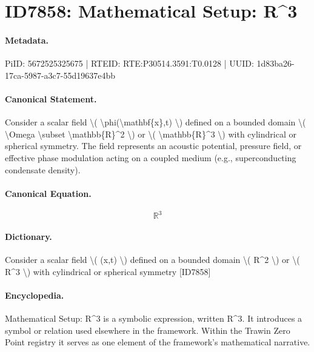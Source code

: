 \section*{ID7858: Mathematical Setup: R\textasciicircum{}3}
\paragraph{Metadata.}
PiID: 5672525325675 | RTEID: RTE:P30514.3591:T0.0128 | UUID: 1d83ba26-17ca-5987-a3c7-55d19637e4bb

\paragraph{Canonical Statement.}
Consider a scalar field \textbackslash{}( \textbackslash{}phi(\textbackslash{}mathbf\{x\},t) \textbackslash{}) defined on a bounded domain \textbackslash{}( \textbackslash{}Omega \textbackslash{}subset \textbackslash{}mathbb\{R\}\textasciicircum{}2 \textbackslash{}) or \textbackslash{}( \textbackslash{}mathbb\{R\}\textasciicircum{}3 \textbackslash{}) with cylindrical or spherical symmetry. The field represents an acoustic potential, pressure field, or effective phase modulation acting on a coupled medium (e.g., superconducting condensate density).

\paragraph{Canonical Equation.}
\[
\mathbb{R}^3
\]

\paragraph{Dictionary.}
Consider a scalar field \textbackslash{}( (x,t) \textbackslash{}) defined on a bounded domain \textbackslash{}( R\textasciicircum{}2 \textbackslash{}) or \textbackslash{}( R\textasciicircum{}3 \textbackslash{}) with cylindrical or spherical symmetry [ID7858]

\paragraph{Encyclopedia.}
Mathematical Setup: R\textasciicircum{}3 is a symbolic expression, written R\textasciicircum{}3. It introduces a symbol or relation used elsewhere in the framework. Within the Trawin Zero Point registry it serves as one element of the framework's mathematical narrative.
